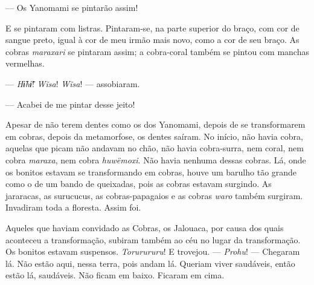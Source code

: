--- Os Yanomami se pintarão assim! 

E se pintaram com listras. Pintaram-se, na parte superior do braço, com
cor de sangue preto, igual à cor de meu irmão mais novo, como a cor de
seu braço. As cobras \textit{maraxari} se pintaram assim; a cobra-coral
também se pintou com manchas vermelhas. 




--- \textit{Hɨ̃hɨ̃}! \textit{Wĩsa}! \textit{Wĩsa}! --- assobiaram. 


--- Acabei de me pintar desse jeito! 

Apesar de não terem dentes como os dos Yanomami, depois de se
transformarem em cobras, depois da metamorfose, os dentes saíram. No
início, não havia cobra, aquelas que picam não andavam no chão, não
havia cobra-surra, nem coral, nem cobra \textit{maraxa}, nem
cobra \textit{huwëmoxi}. Não havia nenhuma dessas cobras. Lá, onde os
bonitos estavam se transformando em cobras, houve um barulho tão grande
como o de um bando de queixadas, pois as cobras estavam surgindo. As
jararacas, as surucucus, as cobras-papagaios e as
cobras \textit{waro} também surgiram. Invadiram toda a floresta. Assim foi. 

Aqueles que haviam convidado as Cobras, os Jalouaca, por causa dos quais
aconteceu a transformação, subiram também ao céu no lugar da
transformação. Os bonitos estavam suspensos. \textit{Torurururu}! E
trovejou. --- \textit{Prohu}! --- Chegaram lá. Não estão aqui, nessa terra,
pois andam lá. Queriam viver saudáveis, então estão lá, saudáveis. Não
ficam em baixo. Ficaram em cima. 

